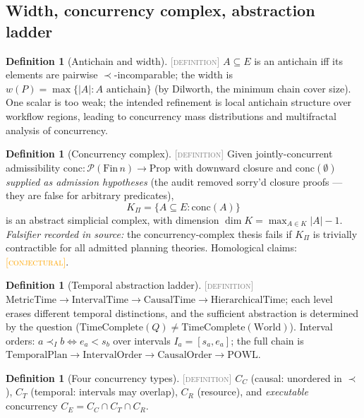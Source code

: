 \documentclass[11pt]{article}
\newcommand{\DEFINITION}{\textcolor{gray}{\textsc{[definition]}}}
\newcommand{\CONJECTURAL}{\textcolor{orange}{\textsc{[conjectural]}}}
\newcommand{\PT}{\Pi}                          %
\theoremstyle{plain}
\theoremstyle{definition}
\newtheorem{definition}[theorem]{Definition}
\begin{document}
\subsection{Width, concurrency complex, abstraction ladder}

\begin{definition}[Antichain and width]\DEFINITION\;
$A \subseteq E$ is an antichain iff its elements are pairwise
$\prec$-incomparable; the width is
$w(P) = \max\{|A| : A \text{ antichain}\}$ (by Dilworth, the minimum chain
cover size). One scalar is too weak; the intended refinement is local
antichain structure over workflow regions, leading to concurrency mass
distributions and multifractal analysis of concurrency.
\end{definition}

\begin{definition}[Concurrency complex]\DEFINITION\;
Given jointly-concurrent admissibility
$\mathrm{conc} : \mathcal{P}(\mathrm{Fin}\,n) \to \mathrm{Prop}$ with
downward closure and $\mathrm{conc}(\emptyset)$ \emph{supplied as admission
hypotheses} (the audit removed sorry'd closure proofs --- they are false for
arbitrary predicates),
\[
  K_\PT = \{ A \subseteq E : \mathrm{conc}(A) \}
\]
is an abstract simplicial complex, with dimension
$\dim K = \max_{A \in K} |A| - 1$. \emph{Falsifier recorded in source:} the
concurrency-complex thesis fails if $K_\PT$ is trivially contractible for
all admitted planning theories. Homological claims: \CONJECTURAL.
\end{definition}

\begin{definition}[Temporal abstraction ladder]\DEFINITION\;
$\mathrm{MetricTime} \to \mathrm{IntervalTime} \to \mathrm{CausalTime} \to
\mathrm{HierarchicalTime}$; each level erases different temporal
distinctions, and the sufficient abstraction is determined by the question
($\mathrm{TimeComplete}(Q) \ne \mathrm{TimeComplete}(\mathrm{World})$).
Interval orders: $a \prec_I b \iff e_a < s_b$ over intervals
$I_a = [s_a, e_a]$; the full chain is
$\mathrm{TemporalPlan} \to \mathrm{IntervalOrder} \to \mathrm{CausalOrder}
\to \mathrm{POWL}$.
\end{definition}

\begin{definition}[Four concurrency types]\DEFINITION\;
$C_C$ (causal: unordered in $\prec$), $C_T$ (temporal: intervals may
overlap), $C_R$ (resource), and \emph{executable} concurrency
$C_E = C_C \cap C_T \cap C_R$.
\end{definition}
\end{document}
